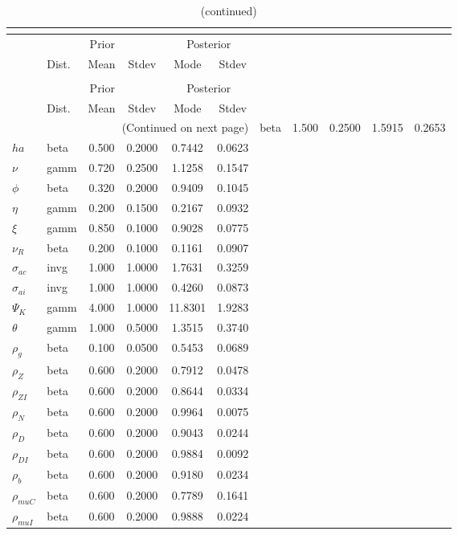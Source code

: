  
\begin{center}
\begin{longtable}{llcccc} 
\caption{Results from posterior maximization (parameters)}\\
 \label{Table:Posterior:1}\\
\toprule 
  & \multicolumn{3}{c}{Prior}  &  \multicolumn{2}{c}{Posterior} \\
  \cmidrule(r{.75em}){2-4} \cmidrule(r{.75em}){5-6}
  & Dist. & Mean  & Stdev & Mode & Stdev \\ 
\midrule \endfirsthead 
\caption{(continued)}\\
 \bottomrule 
  & \multicolumn{3}{c}{Prior}  &  \multicolumn{2}{c}{Posterior} \\
  \cmidrule(r{.75em}){2-4} \cmidrule(r{.75em}){5-6}
  & Dist. & Mean  & Stdev & Mode & Stdev \\ 
\midrule \endhead 
\bottomrule \multicolumn{6}{r}{(Continued on next page)}\endfoot 
\bottomrule\endlastfoot 
${\sigma}$ & beta &   1.500 & 0.2500 &   1.5915 &  0.2653 \\ 
${ha}$ & beta &   0.500 & 0.2000 &   0.7442 &  0.0623 \\ 
$\nu$ & gamm &   0.720 & 0.2500 &   1.1258 &  0.1547 \\ 
${\phi}$ & beta &   0.320 & 0.2000 &   0.9409 &  0.1045 \\ 
${\eta}$ & gamm &   0.200 & 0.1500 &   0.2167 &  0.0932 \\ 
$\xi$ & gamm &   0.850 & 0.1000 &   0.9028 &  0.0775 \\ 
${\nu_R}$ & beta &   0.200 & 0.1000 &   0.1161 &  0.0907 \\ 
${\sigma_{ac}}$ & invg &   1.000 & 1.0000 &   1.7631 &  0.3259 \\ 
${\sigma_{ai}}$ & invg &   1.000 & 1.0000 &   0.4260 &  0.0873 \\ 
${\Psi_{K}}$ & gamm &   4.000 & 1.0000 &  11.8301 &  1.9283 \\ 
${\theta}$ & gamm &   1.000 & 0.5000 &   1.3515 &  0.3740 \\ 
${\rho_g}$ & beta &   0.100 & 0.0500 &   0.5453 &  0.0689 \\ 
${\rho_Z}$ & beta &   0.600 & 0.2000 &   0.7912 &  0.0478 \\ 
${\rho_{ZI}}$ & beta &   0.600 & 0.2000 &   0.8644 &  0.0334 \\ 
${\rho_N}$ & beta &   0.600 & 0.2000 &   0.9964 &  0.0075 \\ 
${\rho_D}$ & beta &   0.600 & 0.2000 &   0.9043 &  0.0244 \\ 
${\rho_{DI}}$ & beta &   0.600 & 0.2000 &   0.9884 &  0.0092 \\ 
${\rho_b}$ & beta &   0.600 & 0.2000 &   0.9180 &  0.0234 \\ 
${\rho_{muC}}$ & beta &   0.600 & 0.2000 &   0.7789 &  0.1641 \\ 
${\rho_{muI}}$ & beta &   0.600 & 0.2000 &   0.9888 &  0.0224 \\ 
\end{longtable}
 \end{center}
